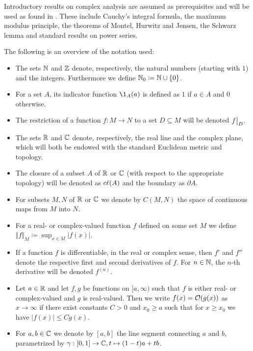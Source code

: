 Introductory results on complex analysis are assumed as prerequisites and will be used as found in \cite{bluemlinger-complex-analysis,stein-shakarchi-princeton}. These include Cauchy's integral formula, the maximum modulus principle, the theorems of Montel, Hurwitz and Jensen, the Schwarz lemma and standard results on power series.

The following is an overview of the notation used:

\begin{itemize}[label=$\rightsquigarrow$]
    \item The sets $\mathbb{N}$ and $\mathbb{Z}$ denote, respectively, the natural numbers (starting with $1$) and the integers. Furthermore we define $\mathbb{N}_0 \coloneqq \mathbb{N} \cup \{ 0 \}$.
    \item For a set $A$, its indicator function $\1_A(a)$ is defined as $1$ if $a \in A$ and $0$ otherwise.
    \item The restriction of a function $f : M \to N$ to a set $D \subseteq M$ will be denoted $\restr{f}{D}$.
    \item The sets $\mathbb{R}$ and $\mathbb{C}$ denote, respectively, the real line and the complex plane, which will both be endowed with the standard Euclidean metric and topology.
    \item The closure of a subset $A$ of $\mathbb{R}$ or $\mathbb{C}$ (with respect to the appropriate topology) will be denoted as $c\ell({A})$ and the boundary as $\partial A$.
    \item For subsets $M, N$ of $\mathbb{R}$ or $\mathbb{C}$ we denote by $C(M, N)$ the space of continuous maps from $M$ into $N$.
    \item For a real- or complex-valued function $f$ defined on some set $M$ we define $\Vert f \Vert_M \coloneqq \sup_{x \in M} \vert f(x) \vert$.
    \item If a function $f$ is differentiable, in the real or complex sense, then $f'$ and $f''$ denote the respective first and second derivatives of $f$. For $n \in \mathbb{N}$, the $n$-th derivative will be denoted $f^{(n)}$.
    \item Let $a \in \mathbb{R}$ and let $f, g$ be functions on $[a, \infty)$ such that $f$ is either real- or complex-valued and $g$ is real-valued. Then we write $f(x) = \mathcal{O}(g(x))$ as $x \to \infty$ if there exist constants $C > 0$ and $x_0 \geq a$ such that for $x \geq x_0$ we have $\vert f(x) \vert \leq C g(x)$.
    \item For $a, b \in \mathbb{C}$ we denote by $[a, b]$ the line segment connecting $a$ and $b$, parametrized by $\gamma : [0, 1] \to \mathbb{C}, t \mapsto (1 - t) a + tb$.

\end{itemize}

